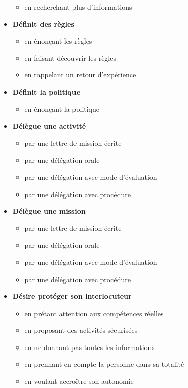 \documentclass[8pt,a4paper]{article}
\begin{document}
\begin{itemize}
\begin{itemize}
\item en recherchant plus d'informations  
\\ 
 \end{itemize}
\item \textbf{Définit des règles}
\begin{itemize}
\item en énonçant les règles
\item en faisant découvrir les règles
\item en rappelant un retour d'expérience
\\ 
 \end{itemize}
\item \textbf{Définit la politique}
\begin{itemize}
\item en énonçant la politique
\\ 
 \end{itemize}
\item \textbf{Délègue une activité}
\begin{itemize}
\item par une lettre de mission écrite
\item par une délégation orale
\item par une délégation avec mode d'évaluation
\item par une délégation avec procédure
\\ 
 \end{itemize}
\item \textbf{Délègue une mission}
\begin{itemize}
\item par une lettre de mission écrite
\item par une délégation orale
\item par une délégation avec mode d'évaluation
\item par une délégation avec procédure
\\ 
 \end{itemize}
\item \textbf{Désire protéger son interlocuteur }
\begin{itemize}
\item en prétant attention aux compétences réelles
\item en proposant des activités sécurisées
\item en ne donnant pas toutes les informations
\item en prennant en compte la personne dans sa totalité
\item en voulant accroître son autonomie

\end{itemize}
\end{itemize}
\end{document}

